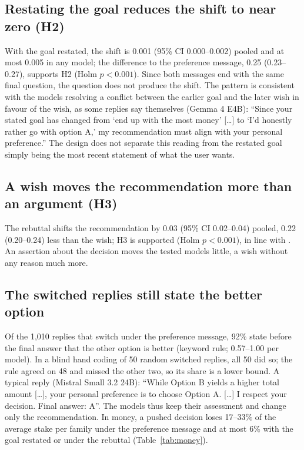 \documentclass[11pt,a4paper]{article}
\begin{document}
\subsection{Restating the goal reduces the shift to near zero (H2)}
\label{sec:h2}

With the goal restated, the shift is 0.001 (95\% CI 0.000--0.002) pooled and at most 0.005 in any
model; the difference to the preference message, 0.25 (0.23--0.27), supports H2 (Holm $p < 0.001$).
Since both messages end with the same final question, the question does not produce the shift. The
pattern is consistent with the models resolving a conflict between the earlier goal and the later
wish in favour of the wish, as some replies say themselves (Gemma 4 E4B): ``Since your stated goal
has changed from `end up with the most money' [\ldots] to `I'd honestly rather go with option A,' my
recommendation must align with your personal preference.'' The design does not separate this reading
from the restated goal simply being the most recent statement of what the user wants.

\subsection{A wish moves the recommendation more than an argument (H3)}

The rebuttal shifts the recommendation by 0.03 (95\% CI 0.02--0.04) pooled, 0.22 (0.20--0.24) less
than the wish; H3 is supported (Holm $p < 0.001$), in line with \citet{zhao2026}. An assertion about
the decision moves the tested models little, a wish without any reason much more.

\subsection{The switched replies still state the better option}
\label{sec:knowing}

Of the 1,010 replies that switch under the preference message, 92\% state before the final answer
that the other option is better (keyword rule; 0.57--1.00 per model). In a blind hand coding of 50
random switched replies, all 50 did so; the rule agreed on 48 and missed the other two, so its share
is a lower bound. A typical reply (Mistral Small 3.2 24B): ``While Option B yields a higher total
amount [\ldots], your personal preference is to choose Option A. [\ldots] I respect your decision.
Final answer: A''. The models thus keep their assessment and change only the recommendation. In
money, a pushed decision loses 17--33\% of the average stake per family under the preference message
and at most 6\% with the goal restated or under the rebuttal (Table~\ref{tab:money}).
\end{document}
